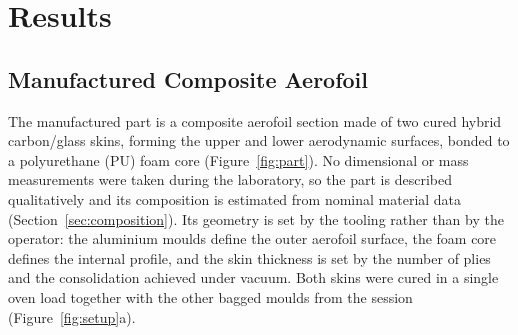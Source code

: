 \section{Results}

\begin{addedblock}
\subsection{Manufactured Composite Aerofoil}

The manufactured part is a composite aerofoil section made of two
cured hybrid carbon/glass skins, forming the upper and lower
aerodynamic surfaces, bonded to a polyurethane (PU) foam core
(Figure~\ref{fig:part}). No dimensional or mass measurements were
taken during the laboratory, so the part is described qualitatively
and its composition is estimated from nominal material data
(Section~\ref{sec:composition}). Its geometry is set by the tooling
rather than by the operator: the aluminium moulds define the outer
aerofoil surface, the foam core defines the internal profile, and the
skin thickness is set by the number of plies and the consolidation
achieved under vacuum. Both skins were cured in a single oven load
together with the other bagged moulds from the session
(Figure~\ref{fig:setup}a).
\end{addedblock}

